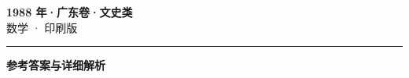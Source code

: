 \documentclass[zihao=5, a4paper]{ctexart}
\begin{document}
\begin{center}
  {\Large\bfseries 1988 年·广东卷·文史类}\\[4pt]
  {\large 数学 · 印刷版}
\end{center}
\medskip
{}

\par\bigskip\hrule\bigskip
{}
\begin{center}{\large\bfseries 参考答案与详细解析}\end{center}
\smallskip

\end{document}
